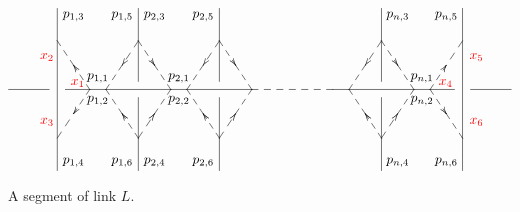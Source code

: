 \documentclass[12pt]{article}
\numberwithin{equation}{section}
\begin{document}
\begin{figure}[htbp]
  \begin{equation*}
    \xy/r1pc/:.
    {
      { (-3,0)\ar@{-} (-0.5,0)},
      { (0.5,0)\ar@{-} (12,0)},
      { (12,0)\ar@{--} (17,0)},
      { (17,0)\ar@{-} (24.5,0)},
      { (25.5,0)\ar@{-} (28,0)},
      { (0,5)\ar@{-} (0,-5)},
      { (25,5)\ar@{-} (25,-5)},
      { (5,5)\ar@{-} (5,0.5)},
      { (5,-0.5)\ar@{-} (5,-5)},
%
      { (10,5)\ar@{-} (10,0.5)},
      { (10,-0.5)\ar@{-} (10,-5)},
%
      { (20,5)\ar@{-} (20,0.5)},
      { (20,-0.5)\ar@{-} (20,-5)},
      { (2.5,0.7)*+{p_{1,1}} },
      { (2.5,-0.7)*+{p_{1,2}} },
      { (1,4.5)*+{p_{1,3}} },
      { (1,-4.5)*+{p_{1,4}} },
      { (4,4.5)*+{p_{1,5}} },
      { (4,-4.5)*+{p_{1,6}} },
%
      { (7.5,0.7)*+{p_{2,1}} },
      { (7.5,-0.7)*+{p_{2,2}} },
      { (6,4.5)*+{p_{2,3}} },
      { (6,-4.5)*+{p_{2,4}} },
      { (9,4.5)*+{p_{2,5}} },
      { (9,-4.5)*+{p_{2,6}} },
%
      { (22.5,0.7)*+{p_{n,1}} },
      { (22.5,-0.7)*+{p_{n,2}} },
      { (21,4.5)*+{p_{n,3}} },
      { (21,-4.5)*+{p_{n,4}} },
      { (24,4.5)*+{p_{n,5}} },
      { (24,-4.5)*+{p_{n,6}} },
      { (2, 0) \ar@{--}|@{>} (0,3)  },
      { (2, 0) \ar@{--}|@{>} (0,-3)  },
      { (3, 0) \ar@{--}|@{<} (5,3)  },
      { (3, 0) \ar@{--}|@{<} (5,-3)  },
%
      { (7, 0) \ar@{--}|@{<} (5,3)  },
      { (7, 0) \ar@{--}|@{<} (5,-3)  },
      { (8, 0) \ar@{--}|@{<} (10,3)  },
      { (8, 0) \ar@{--}|@{<} (10,-3)  },
%
      { (12, 0) \ar@{--}|@{<} (10,3)  },
      { (12, 0) \ar@{--}|@{<} (10,-3)  },
%
      { (18, 0) \ar@{--}|@{<} (20,3)  },
      { (18, 0) \ar@{--}|@{<} (20,-3)  },
      { (22, 0) \ar@{--}|@{<} (20,3)  },
      { (22, 0) \ar@{--}|@{<} (20,-3)  },
%
      { (23, 0) \ar@{--}|@{>} (25,3)  },
      { (23, 0) \ar@{--}|@{>} (25,-3)  },
%
      { (1.4,0.4)*+{\text{\textcolor{red}{$x_1$} }} },
      { (-0.5,2)*+{\text{\textcolor{red}{$x_2$} }} },
      { (-0.5,-2)*+{\text{\textcolor{red}{$x_3$} }} },
%
      { (24.1,0.4)*+{\text{\textcolor{red}{$x_4$} }} },
      { (26,2)*+{\text{\textcolor{red}{$x_5$} }} },
      { (26,-2)*+{\text{\textcolor{red}{$x_6$} }} },
      }
    \endxy
  \end{equation*}
  \caption{A segment of link $L$.}
  \label{fig:Ridge_2}
\end{figure}
\end{document}
